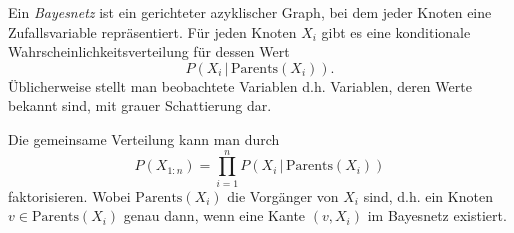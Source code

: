 \documentclass[ngerman]{../LaTeX-Templates/Paper/paper}
\begin{document}
\begin{definition}[Bayesnetz]
	Ein \emph{Bayesnetz} ist ein gerichteter azyklischer Graph, bei dem jeder Knoten eine Zufallsvariable repräsentiert. Für jeden Knoten $X_i$ gibt es eine konditionale Wahrscheinlichkeitsverteilung für dessen Wert
	\begin{equation*}
		P(X_i\,|\,\mathrm{Parents}(X_i)).
	\end{equation*}
	Üblicherweise stellt man beobachtete Variablen d.h. Variablen, deren Werte bekannt sind, mit grauer Schattierung dar.
\end{definition}
Die gemeinsame Verteilung kann man durch
\begin{equation*}
	P(X_{1:n})=\prod_{i=1}^nP(X_i\,|\,\mathrm{Parents}(X_i))
\end{equation*}
faktorisieren. Wobei $\mathrm{Parents}(X_i)$ die Vorgänger von $X_i$ sind, d.h. ein Knoten $v\in\mathrm{Parents}(X_i)$ genau dann, wenn eine Kante $(v,X_i)$ im Bayesnetz existiert.
\end{document}
